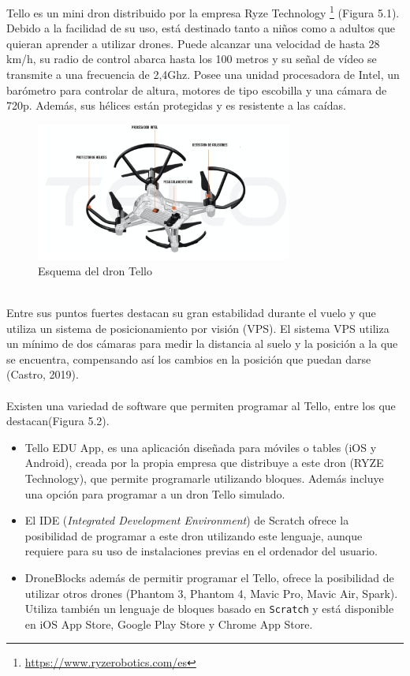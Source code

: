 \documentclass{report}
\begin{document}
Tello es un mini dron distribuido por la empresa Ryze Technology \footnote{\url{https://www.ryzerobotics.com/es}} (Figura 5.1). Debido a la facilidad de su uso, está destinado tanto a niños como a adultos que quieran aprender a utilizar drones. Puede alcanzar una velocidad de hasta 28 km/h, su radio de control abarca hasta los 100 metros y su señal de vídeo se transmite a una frecuencia de 2,4Ghz. Posee una unidad procesadora de Intel, un barómetro para controlar de altura, motores de tipo escobilla y una cámara de 720p. Además, sus hélices están protegidas y es resistente a las caídas.
\\
\begin{figure}[h!]
  \centering
    \includegraphics[width=0.75\textwidth]{images/partes_dron_tello.png}
  \caption{Esquema del dron Tello}
  \label{Esquema del dron Tello}
\end{figure}
\\
Entre sus puntos fuertes destacan su gran estabilidad durante el vuelo y que utiliza un sistema de posicionamiento por visión (VPS). El sistema VPS utiliza un mínimo de dos cámaras para medir la distancia al suelo y la posición a la que se encuentra, compensando así los cambios en la posición que puedan darse (Castro, 2019).
\\
\\
Existen una variedad de software que permiten programar al Tello, entre los que destacan(Figura 5.2).
\begin{itemize}
	\item Tello EDU App, es una aplicación diseñada para móviles o tables (iOS y Android), creada por la propia empresa que distribuye a este dron (RYZE Technology), que permite programarle utilizando bloques. Además incluye una opción para programar a un dron Tello simulado.
	\item El IDE (\textit{Integrated Development Environment}) de Scratch ofrece la posibilidad de programar a este dron utilizando este lenguaje, aunque requiere para su uso de instalaciones previas en el ordenador del usuario.
	\item DroneBlocks además de permitir programar el Tello, ofrece la posibilidad de utilizar otros drones (Phantom 3, Phantom 4, Mavic Pro, Mavic Air, Spark). Utiliza también un lenguaje de bloques basado en \texttt{Scratch} y está disponible en iOS App Store,  Google Play Store y Chrome App Store.
\end{itemize}
\end{document}
